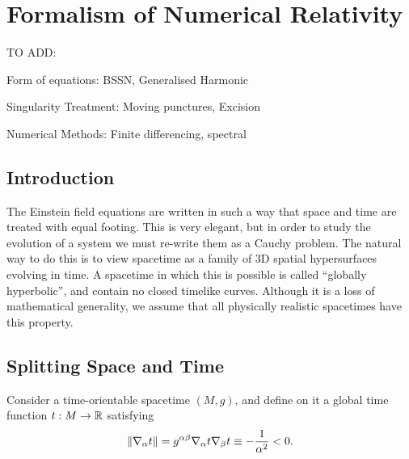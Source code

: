 


\chapter{Formalism of Numerical Relativity}      

TO ADD:

Form of equations: BSSN, Generalised Harmonic

Singularity Treatment: Moving punctures, Excision

Numerical Methods: Finite differencing, spectral
     
\section{Introduction}     
The Einstein field equations are written in such a way that space and time are treated with equal footing. This is very elegant, but in order to study the evolution of a system we must re-write them as a Cauchy problem. The natural way to do this is to view spacetime as a family of 3D spatial hypersurfaces evolving in time. A spacetime in which this is possible is called ``globally hyperbolic'', and contain no closed timelike curves. Although it is a loss of mathematical generality, we assume that all physically realistic spacetimes have this property.

\section{Splitting Space and Time}
Consider a time-orientable spacetime $(M, g)$, and define on it a global time function $t:M \rightarrow {\mathbb R}$ satisfying
\begin{equation}\label{eq:gtf}
\| {\nabla}_\alpha t \|= g^{\alpha \beta}{\nabla}_\alpha t {\nabla}_\beta t \equiv -\frac{1}{\alpha^2} < 0.
\end{equation}

